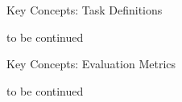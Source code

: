 \documentclass[aspectratio=169,xcolor=dvipsnames]{beamer}
\begin{document}
\begin{frame}{Key Concepts: Task Definitions}

to be continued

\end{frame}


\begin{frame}{Key Concepts: Evaluation Metrics}

to be continued

\end{frame}
\end{document}
